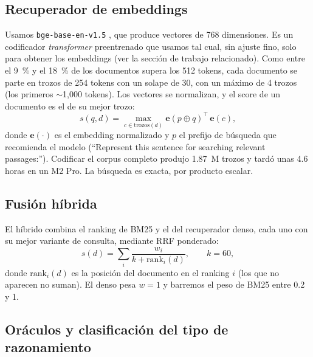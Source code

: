 \documentclass[11pt,a4paper]{article}
\begin{document}
\subsection{Recuperador de embeddings}
\label{sec:denso}

Usamos \texttt{bge-base-en-v1.5} \citep{xiao2024cpack}, que produce vectores de 768 dimensiones. Es un codificador \emph{transformer} preentrenado que usamos tal cual, sin ajuste fino, solo para obtener los embeddings (ver la sección de trabajo relacionado). Como entre el 9~\% y el 18~\% de los documentos supera los 512 tokens, cada documento se parte en trozos de 254 tokens con un solape de 30, con un máximo de 4 trozos (los primeros $\sim$1,000 tokens). Los vectores se normalizan, y el score de un documento es el de su mejor trozo:
\begin{equation}
s(q,d) = \max_{c \in \mathrm{trozos}(d)} \mathbf{e}(p \oplus q)^{\top}\, \mathbf{e}(c),
\end{equation}
donde $\mathbf{e}(\cdot)$ es el embedding normalizado y $p$ el prefijo de búsqueda que recomienda el modelo (``Represent this sentence for searching relevant passages:''). Codificar el corpus completo produjo 1.87~M trozos y tardó unas 4.6 horas en un M2 Pro. La búsqueda es exacta, por producto escalar.

\subsection{Fusión híbrida}
\label{sec:hibrido}

El híbrido combina el ranking de BM25 y el del recuperador denso, cada uno con su mejor variante de consulta, mediante RRF ponderado:
\begin{equation}
s(d) = \sum_{i} \frac{w_i}{k + \mathrm{rank}_i(d)}, \qquad k = 60,
\end{equation}
donde $\mathrm{rank}_i(d)$ es la posición del documento en el ranking $i$ (los que no aparecen no suman). El denso pesa $w = 1$ y barremos el peso de BM25 entre 0.2 y 1.

\subsection{Oráculos y clasificación del tipo de razonamiento}
\label{sec:oraculos}
\end{document}
